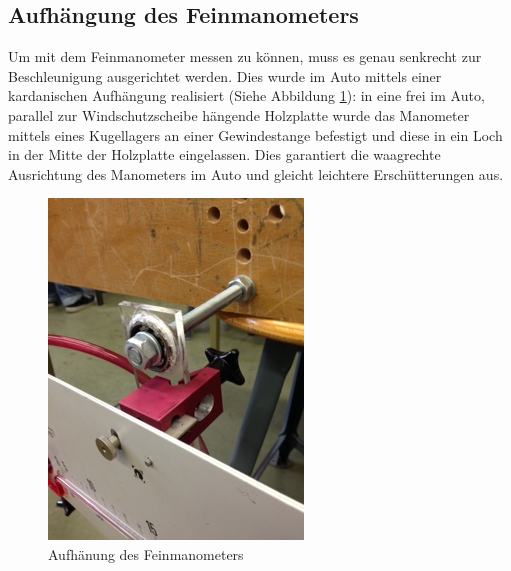 \subsection{Aufhängung des Feinmanometers}
Um mit dem Feinmanometer messen zu können, muss es genau senkrecht zur Beschleunigung ausgerichtet werden. Dies wurde im Auto mittels einer kardanischen Aufhängung realisiert (Siehe Abbildung \ref{aufhängung}): in eine frei im Auto, parallel zur Windschutzscheibe hängende Holzplatte wurde das Manometer mittels eines Kugellagers an einer Gewindestange befestigt und diese in ein Loch in der Mitte der Holzplatte eingelassen. Dies garantiert die waagrechte Ausrichtung des Manometers im Auto und gleicht leichtere Erschütterungen aus. 


\begin{figure}
\centering
	\includegraphics[width=.5\textwidth]{images/aufhaengung.JPG}
	\caption{Aufhänung des Feinmanometers}
	\label{aufhängung}
\end{figure}
